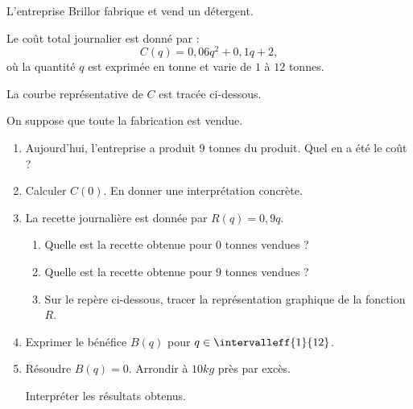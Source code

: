 \documentclass[12pt,openright,twoside,french]{book}
\begin{document}

L'entreprise Brillor fabrique et vend un détergent.\par
Le coût total journalier est donné par :
\[C(q) = 0,06q^2 + 0,1 q + 2,\] où la quantité $q$ est exprimée en tonne et varie de $1$ à $12$ tonnes.\par
La courbe représentative de $C$ est tracée ci-dessous.\par
On suppose que toute la fabrication est vendue.\medskip

\begin{enumerate}
    \item Aujourd'hui, l'entreprise a produit $9$ tonnes du produit. Quel en a été le coût ?
    \item Calculer $C(0)$. En donner une interprétation concrète.
    \item La recette journalière est donnée par $R(q) = 0,9q$.
        \begin{enumerate}
            \item Quelle est la recette obtenue pour $0$ tonnes vendues ?
            \item Quelle est la recette obtenue pour $9$ tonnes vendues ?
            \item Sur le repère ci-dessous, tracer la représentation graphique de la fonction $R$.
        \end{enumerate}
    \item Exprimer le bénéfice $B(q)$ pour $q \in \intervalleff{1}{12}$.
    \item Résoudre $B(q) = 0$. Arrondir à $10kg$ près par excès.\par Interpréter les résultats obtenus.
\end{enumerate}

\begin{center}
\end{center}
\end{document}
